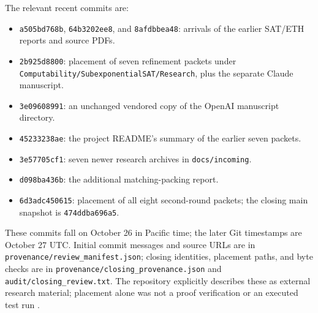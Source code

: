 \documentclass[11pt,letterpaper]{article}
\theoremstyle{definition}\newtheorem{definition}[theorem]{Definition}
\theoremstyle{remark}\newtheorem{remark}[theorem]{Remark}
\begin{document}
The relevant recent commits are:
\begin{itemize}[leftmargin=1.5em]
\item \nolinkurl{a505bd768b}, \nolinkurl{64b3202ee8}, and \nolinkurl{8afdbbea48}: arrivals
of the earlier SAT/ETH reports and source PDFs.
\item \nolinkurl{2b925d8800}: placement of seven refinement packets under
\nolinkurl{Computability/SubexponentialSAT/Research}, plus the separate Claude manuscript.
\item \nolinkurl{3e09608991}: an unchanged vendored copy of the OpenAI manuscript directory.
\item \nolinkurl{45233238ae}: the project README's summary of the earlier seven packets.
\item \nolinkurl{3e57705cf1}: seven newer research archives in \nolinkurl{docs/incoming}.
\item \nolinkurl{d098ba436b}: the additional matching-packing report.
\item \nolinkurl{6d3adc450615}: placement of all eight second-round packets; the closing
main snapshot is \nolinkurl{474ddba696a5}.
\end{itemize}
These commits fall on October 26 in Pacific time; the later Git timestamps are October 27
UTC. Initial commit messages and source URLs are in \nolinkurl{provenance/review_manifest.json}; closing identities, placement paths, and byte checks are in \nolinkurl{provenance/closing_provenance.json} and \nolinkurl{audit/closing_review.txt}.
The repository explicitly describes these as external research material; placement alone
was not a proof verification or an executed test run \cite{repoindex}.
\end{document}
